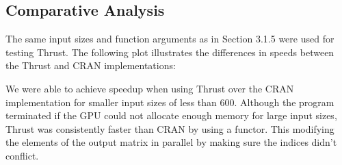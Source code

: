 \documentclass{article}
\begin{document}
\subsection{Comparative Analysis}
The same input sizes and function arguments as in Section 3.1.5 were used for testing Thrust. The following plot illustrates the differences in speeds between the Thrust and CRAN implementations:\\
\null

We were able to achieve speedup when using Thrust over the CRAN implementation for smaller input sizes of less than 600. Although the program terminated if the GPU could not allocate enough memory for large input sizes, Thrust was consistently faster than CRAN by using a functor. This modifying the elements of the output matrix in parallel by making sure the indices didn't conflict. 
\end{document}
